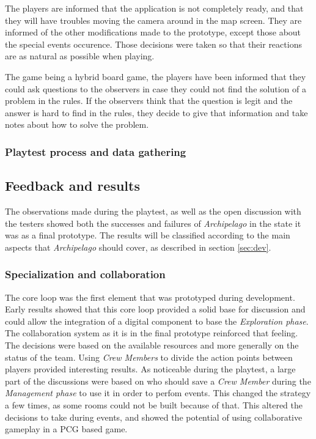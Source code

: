 The players are informed that the application is not completely ready, and that they will have troubles moving the camera around in the map screen. They are informed of the other modifications made to the prototype, except those about the special events occurence. Those decisions were taken so that their reactions are as natural as possible when playing.

The game being a hybrid board game, the players have been informed that they could ask questions to the observers in case they could not find the solution of a problem in the rules. If the observers think that the question is legit and the answer is hard to find in the rules, they decide to give that information and take notes about how to solve the problem. 

\subsubsection{Playtest process and data gathering}

\subsection{Feedback and results}
The observations made during the playtest, as well as the open discussion with the testers showed both the successes and failures of \textit{Archipelago} in the state it was as a final prototype. The results will be classified according to the main aspects that \textit{Archipelago} should cover, as described in section \ref{sec:dev}.

\subsubsection{Specialization and collaboration}
The core loop was the first element that was prototyped during development. Early results showed that this core loop provided a solid base for discussion and could allow the integration of a digital component to base the \textit{Exploration phase}. The collaboration system as it is in the final prototype reinforced that feeling. The decisions were based on the available resources and more generally on the status of the team. Using \textit{Crew Members} to divide the action points between players provided interesting results. As noticeable during the playtest, a large part of the discussions were based on who should save a \textit{Crew Member} during the \textit{Management phase} to use it in order to perfom events. This changed the strategy a few times, as some rooms could not be built because of that. This altered the decisions to take during events, and showed the potential of using collaborative gameplay in a PCG based game.

